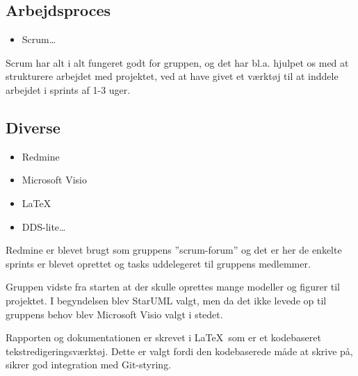 \subsection*{Arbejdsproces} 
\begin{itemize}
  \item Scrum\ldots
\end{itemize}
Scrum har alt i alt fungeret godt for gruppen, og det har bl.a. hjulpet os med at strukturere arbejdet med projektet, ved at have givet et værktøj til at inddele arbejdet i sprints af 1-3 uger. 

\subsection*{Diverse}\label{subsec:udviklingdiverse} 
\begin{itemize}
  \item Redmine
  \item Microsoft Visio
  \item \LaTeX
  \item DDS-lite\ldots
\end{itemize}
Redmine er blevet brugt som gruppens ''scrum-forum'' og det er her de enkelte sprints er blevet oprettet og tasks uddelegeret til gruppens medlemmer.

Gruppen vidste fra starten at der skulle oprettes mange modeller og figurer til projektet. I begyndelsen blev StarUML valgt, men da det ikke levede op til gruppens behov blev Microsoft Visio valgt i stedet.

Rapporten og dokumentationen er skrevet i \LaTeX\ som er et kodebaseret tekstredigeringsværktøj. Dette er valgt fordi den kodebaserede måde at skrive på, sikrer god integration med Git-styring.
